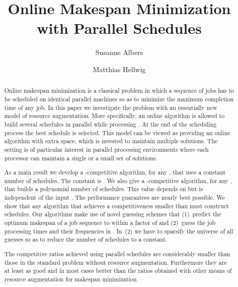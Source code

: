 \documentclass{llncs}
\begin{document}
\title{Online Makespan Minimization with Parallel Schedules\vspace*{-0.3cm}}
\author{Susanne Albers \and Matthias Hellwig}

\maketitle

\begin{abstract}

Online makespan minimization is a classical problem in which a sequence of jobs 
has to be scheduled on  identical parallel machines so as to minimize the maximum completion time of any job.
In this paper we investigate the problem with an essentially new model of resource augmentation.
More specifically, an online algorithm is allowed to build several schedules in parallel while processing . 
At the end of the scheduling process the best schedule is selected. This model can be viewed as 
providing an online algorithm with extra space, which is invested to maintain multiple solutions. The 
setting is of particular interest in parallel processing environments where each processor can maintain a 
single or a small set of solutions. 

As a main result we develop a -competitive algorithm, for any , that uses a 
constant number of schedules. The constant is . We also give 
a -competitive algorithm, 
for any , that builds a polynomial number of  
schedules. This value depends on  but is independent of the input . The performance guarantees
are nearly best possible. We show that any algorithm that achieves a competitiveness smaller than 
must construct  schedules. Our algorithms make use of novel guessing schemes that (1)~predict
the optimum makespan of a job sequence  to within a factor of  and (2)~guess the job processing 
times and their frequencies in . In~(2) we have to sparsify the universe of all guesses so
as to reduce the number of schedules to a constant.

The competitive ratios achieved using parallel schedules are considerably smaller than
those in the standard problem without resource augmentation. Furthermore they are at least as good and
in most cases better than the ratios obtained with other means of resource augmentation for makespan
minimization.

\end{abstract}
\end{document}
